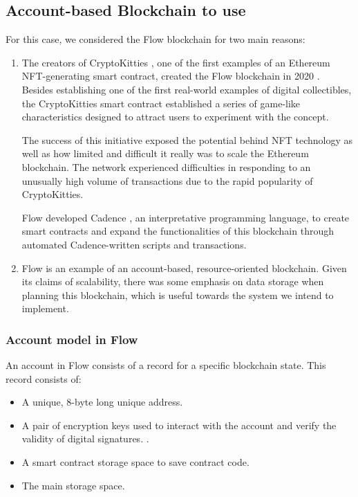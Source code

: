 \subsection{Account-based Blockchain to use}
For this case, we considered the Flow blockchain for two main reasons:

\begin{enumerate}
    \item{The creators of CryptoKitties \cite{Gharegozlou2019}, one of the first examples of an Ethereum NFT-generating smart contract, created the Flow blockchain in 2020 \cite{Hentschel2019a}. Besides establishing one of the first real-world examples of digital collectibles, the CryptoKitties smart contract established a series of game-like characteristics designed to attract users to experiment with the concept.
          \par
          The success of this initiative exposed the potential behind NFT technology as well as how limited and difficult it really was to scale the Ethereum blockchain. The network experienced difficulties in responding to an unusually high volume of transactions due to the rapid popularity of CryptoKitties.
          \par
          Flow developed Cadence \cite{Cadence2023}, an interpretative programming language, to create smart contracts and expand the functionalities of this blockchain through automated Cadence-written scripts and transactions.}

    \item{Flow is an example of an account-based, resource-oriented blockchain. Given its claims of scalability, there was some emphasis on data storage when planning this blockchain, which is useful towards the system we intend to implement.}

\end{enumerate}

\subsubsection{Account model in Flow}
\label{sec:flow_accounts}
An account in Flow consists of a record for a specific blockchain state. This record consists of:

\begin{itemize}
    \item{A unique, 8-byte long unique address.}
    \item{A pair of encryption keys used to interact with the account and verify the validity of digital signatures. \cite{flow2024}}.
    \item{A smart contract storage space to save contract code.}
    \item{The main storage space.}
\end{itemize}

